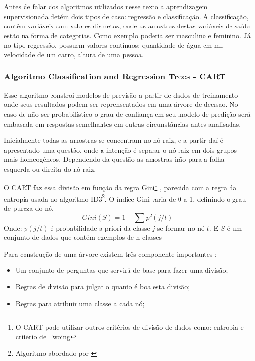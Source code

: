 Antes de falar dos algoritmos utilizados nesse texto a aprendizagem supervisionada detém dois tipos de caso: regressão e classificação. A classificação, contêm variáveis com valores discretos, onde as amostras destas variáveis de saída estão na forma de categorias. Como exemplo poderia ser masculino e feminino. Já no tipo regressão, possuem valores contínuos: quantidade de água em ml, velocidade de um carro, altura de uma pessoa.


\subsubsection{Algoritmo Classification and Regression Trees  - CART}\label{cap:refTeor:sssec:cart}
Esse algoritmo constroi modelos de previsão a partir de dados de treinamento onde seus resultados podem ser reprensentados em uma árvore de decisão. No caso de não ser probabilístico o grau de confiança em seu modelo de predição será embasada em respostas semelhantes em outras circunstâncias antes analisadas. 

Inicialmente todas as amostras se concentram no nó raiz, e a partir daí é apresentado uma questão, onde a intenção é separar o nó raiz em dois grupos mais homeogêneos. Dependendo da questão as amostras irão para a folha esquerda ou direita do nó raiz.

O CART faz essa divisão em função da regra Gini\footnote{O CART pode utilizar outros critérios de divisão de dados como: entropia e critério de Twoing} \cite{braiman1984}, parecida com a regra da entropia usada no algoritmo ID3\footnote{Algoritmo abordado por \cite{Quinlan1986}}. O índice Gini varia de 0 a 1, definindo o grau de pureza do nó. 
\begin{equation}
Gini(S)= 1 - \sum p^2(j/t)
 \label{eq:cartGini}
\end{equation}
Onde: ${p(j/t)}$ é probabilidade a priori da classe ${j}$ se formar no nó ${t}$. E ${S}$ é um conjunto de dados que contém exemplos de n classes

Para construção de uma árvore existem três componente importantes \cite{yohannes1999classification}: 
\begin{itemize}
[noitemsep]
 \item Um conjunto de perguntas que servirá de base para fazer uma divisão;
 \item Regras de divisão para julgar o quanto é boa esta divisão;
 \item Regras para atribuir uma classe a cada nó;
\end{itemize}

